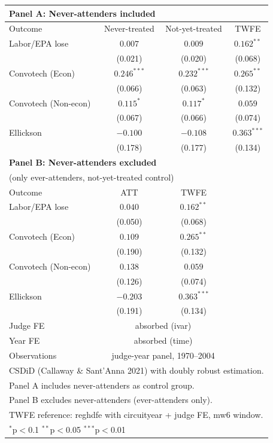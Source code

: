 \begin{tabular}{lccc}
\toprule
\multicolumn{4}{l}{\textbf{Panel A: Never-attenders included}} \\
\midrule
Outcome & Never-treated & Not-yet-treated & TWFE \\
\midrule
Labor/EPA lose & \(0.007\) & \(0.009\) & \(0.162^{**}\) \\
 & (0.021) & (0.020) & (0.068) \\
Convotech (Econ) & \(0.246^{***}\) & \(0.232^{***}\) & \(0.265^{**}\) \\
 & (0.066) & (0.063) & (0.132) \\
Convotech (Non-econ) & \(0.115^{*}\) & \(0.117^{*}\) & \(0.059\) \\
 & (0.067) & (0.066) & (0.074) \\
Ellickson & \(-0.100\) & \(-0.108\) & \(0.363^{***}\) \\
 & (0.178) & (0.177) & (0.134) \\
\midrule
\multicolumn{4}{l}{\textbf{Panel B: Never-attenders excluded}} \\
\multicolumn{4}{l}{(only ever-attenders, not-yet-treated control)} \\
\midrule
Outcome & ATT & TWFE \\
Labor/EPA lose & \(0.040\) & \(0.162^{**}\) \\
 & (0.050) & (0.068) \\
Convotech (Econ) & \(0.109\) & \(0.265^{**}\) \\
 & (0.190) & (0.132) \\
Convotech (Non-econ) & \(0.138\) & \(0.059\) \\
 & (0.126) & (0.074) \\
Ellickson & \(-0.203\) & \(0.363^{***}\) \\
 & (0.191) & (0.134) \\
\midrule
Judge FE & \multicolumn{2}{c}{absorbed (ivar)} \\
Year FE & \multicolumn{2}{c}{absorbed (time)} \\
Observations & \multicolumn{2}{c}{judge-year panel, 1970--2004} \\
\bottomrule
\multicolumn{4}{l}{\footnotesize CSDiD (Callaway \& Sant'Anna 2021) with doubly robust estimation.} \\
\multicolumn{4}{l}{\footnotesize Panel A includes never-attenders as control group.} \\
\multicolumn{4}{l}{\footnotesize Panel B excludes never-attenders (ever-attenders only).} \\
\multicolumn{4}{l}{\footnotesize TWFE reference: reghdfe with circuityear + judge FE, mw6 window.} \\
\multicolumn{4}{l}{\footnotesize \(^{*}\)p\(<\)0.1 \(^{**}\)p\(<\)0.05 \(^{***}\)p\(<\)0.01} \\
\end{tabular}
